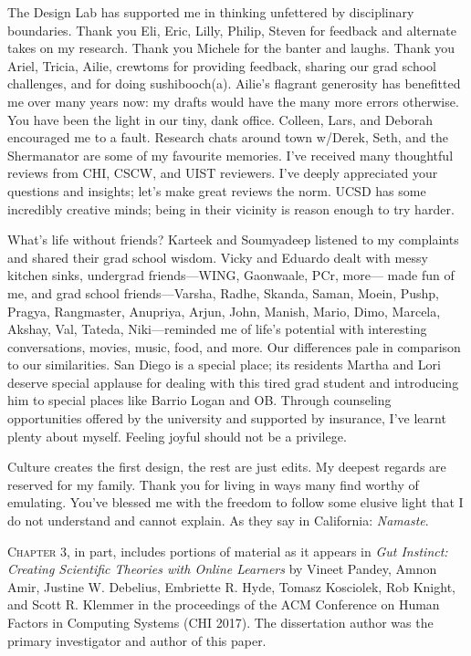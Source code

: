 \begin{frontmatter}
\begin{acknowledgements}
The Design Lab has supported me in thinking unfettered by disciplinary boundaries. Thank you Eli, Eric, Lilly, Philip, Steven for feedback and alternate takes on my research. Thank you Michele for the banter and laughs. Thank you Ariel, Tricia, Ailie, crewtoms for providing feedback, sharing our grad school challenges, and for doing sushibooch(a). Ailie's flagrant generosity has benefitted me over many years now: my drafts would have the many more errors otherwise. You have been the light in our tiny, dank office. Colleen, Lars, and Deborah encouraged me to a fault. Research chats around town w/Derek, Seth, and the Shermanator are some of my favourite memories. I’ve received many thoughtful reviews from CHI, CSCW, and UIST reviewers. I've deeply appreciated your questions and insights; let’s make great reviews the norm. UCSD has some incredibly creative minds; being in their vicinity is reason enough to try harder. 

What’s life without friends? Karteek and Soumyadeep listened to my complaints and shared their grad school wisdom. Vicky and Eduardo dealt with messy kitchen sinks, undergrad friends---WING, Gaonwaale, PCr, more--- made fun of me, and grad school friends---Varsha, Radhe, Skanda, Saman, Moein, Pushp, Pragya, Rangmaster, Anupriya, Arjun, John, Manish, Mario, Dimo, Marcela, Akshay, Val, Tateda, Niki---reminded me of life's potential with interesting conversations, movies, music, food, and more. Our differences pale in comparison to our similarities. San Diego is a special place; its residents Martha and Lori deserve special applause for dealing with this tired grad student and introducing him to special places like Barrio Logan and OB. Through counseling opportunities offered by the university and supported by insurance, I’ve learnt plenty about myself. Feeling joyful should not be a privilege.

Culture creates the first design, the rest are just edits. My deepest regards are reserved for my family. Thank you for living in ways many find worthy of emulating. You've blessed me with the freedom to follow some elusive light that I do not understand and cannot explain. As they say in California: \textit{Namaste}. 



\vspace{0.25in}

\textsc{Chapter 3}, in part, includes portions of material as it appears in \emph{Gut Instinct: Creating Scientific Theories with Online Learners} by Vineet Pandey, Amnon Amir, Justine W. Debelius, Embriette R. Hyde, Tomasz Kosciolek, Rob Knight, and Scott R. Klemmer in the proceedings of the ACM Conference on Human Factors in Computing Systems (CHI 2017). The dissertation author was the primary investigator and author of this paper.


\end{acknowledgements}
\end{frontmatter}
